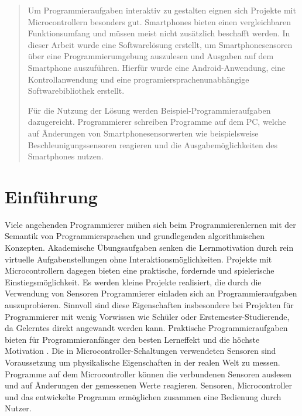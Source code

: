 \documentclass[11pt,a4paper]{report}
\begin{document}

\begin{abstract}

Um Programmieraufgaben interaktiv zu gestalten eignen sich Projekte mit Microcontrollern besonders gut.
Smartphones bieten einen vergleichbaren Funktionsumfang und müssen meist nicht zusätzlich beschafft werden.
In dieser Arbeit wurde eine Softwarelösung erstellt, um Smartphonesensoren über eine Programmierumgebung auszulesen und Ausgaben auf dem Smartphone auszuführen.
Hierfür wurde eine Android-Anwendung, eine Kontrollanwendung und eine programiersprachenunabhängige Softwarebibliothek erstellt.

Für die Nutzung der Lösung werden Beispiel-Programmieraufgaben dazugereicht.
Programmierer schreiben Programme auf dem PC, welche auf Änderungen von Smartphonesensorwerten wie beispielsweise Beschleunigungssensoren reagieren und die Ausgabemöglichkeiten des Smartphones nutzen.
\end{abstract}

\tableofcontents

\chapter{Einführung} \label{chap:intro}
Viele angehenden Programmierer mühen sich beim Programmierenlernen mit der Semantik von Programmiersprachen und grundlegenden algorithmischen Konzepten.
Akademische Übungsaufgaben senken die Lernmotivation durch rein virtuelle Aufgabenstellungen ohne Interaktionsmöglichkeiten.
Projekte mit Microcontrollern dagegen bieten eine praktische, fordernde und spielerische Einstiegsmöglichkeit.
Es werden kleine Projekte realisiert, die durch die Verwendung von Sensoren Programmierer einladen sich an Programmieraufgaben auszuprobieren.
Sinnvoll sind diese Eigenschaften insbesondere bei Projekten für Programmierer mit wenig Vorwissen wie Schüler oder Erstemester-Studierende, da Gelerntes direkt angewandt werden kann.
Praktische Programmieraufgaben bieten für Programmieranfänger den besten Lerneffekt und die  höchste Motivation \cite{learning_computer_programming}.
Die in Microcontroller-Schaltungen verwendeten Sensoren sind Voraussetzung um physikalische Eigenschaften in der realen Welt zu messen.
Programme auf dem Microcontroller können die verbundenen Sensoren auslesen und auf Änderungen der gemessenen Werte reagieren.
Sensoren, Microcontroller und das entwickelte Programm ermöglichen zusammen eine Bedienung durch Nutzer.
\end{document}

